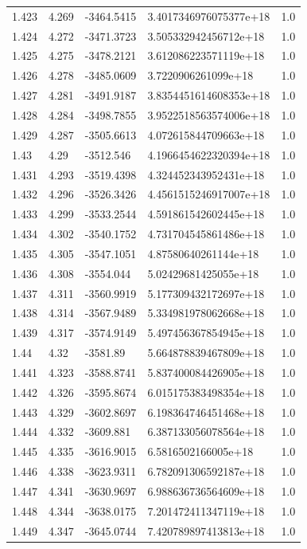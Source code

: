 \begin{tabular}{lllll}
1.423 & 4.269 & -3464.5415 & 3.4017346976075377e+18 & 1.0 \\
1.424 & 4.272 & -3471.3723 & 3.505332942456712e+18 & 1.0 \\
1.425 & 4.275 & -3478.2121 & 3.612086223571119e+18 & 1.0 \\
1.426 & 4.278 & -3485.0609 & 3.7220906261099e+18 & 1.0 \\
1.427 & 4.281 & -3491.9187 & 3.8354451614608353e+18 & 1.0 \\
1.428 & 4.284 & -3498.7855 & 3.9522518563574006e+18 & 1.0 \\
1.429 & 4.287 & -3505.6613 & 4.072615844709663e+18 & 1.0 \\
1.43 & 4.29 & -3512.546 & 4.1966454622320394e+18 & 1.0 \\
1.431 & 4.293 & -3519.4398 & 4.324452343952431e+18 & 1.0 \\
1.432 & 4.296 & -3526.3426 & 4.4561515246917007e+18 & 1.0 \\
1.433 & 4.299 & -3533.2544 & 4.591861542602445e+18 & 1.0 \\
1.434 & 4.302 & -3540.1752 & 4.731704545861486e+18 & 1.0 \\
1.435 & 4.305 & -3547.1051 & 4.87580640261144e+18 & 1.0 \\
1.436 & 4.308 & -3554.044 & 5.02429681425055e+18 & 1.0 \\
1.437 & 4.311 & -3560.9919 & 5.177309432172697e+18 & 1.0 \\
1.438 & 4.314 & -3567.9489 & 5.334981978062668e+18 & 1.0 \\
1.439 & 4.317 & -3574.9149 & 5.497456367854945e+18 & 1.0 \\
1.44 & 4.32 & -3581.89 & 5.664878839467809e+18 & 1.0 \\
1.441 & 4.323 & -3588.8741 & 5.837400084426905e+18 & 1.0 \\
1.442 & 4.326 & -3595.8674 & 6.015175383498354e+18 & 1.0 \\
1.443 & 4.329 & -3602.8697 & 6.198364746451468e+18 & 1.0 \\
1.444 & 4.332 & -3609.881 & 6.387133056078564e+18 & 1.0 \\
1.445 & 4.335 & -3616.9015 & 6.5816502166005e+18 & 1.0 \\
1.446 & 4.338 & -3623.9311 & 6.782091306592187e+18 & 1.0 \\
1.447 & 4.341 & -3630.9697 & 6.988636736564609e+18 & 1.0 \\
1.448 & 4.344 & -3638.0175 & 7.201472411347119e+18 & 1.0 \\
1.449 & 4.347 & -3645.0744 & 7.420789897413813e+18 & 1.0 \\

\end{tabular}
